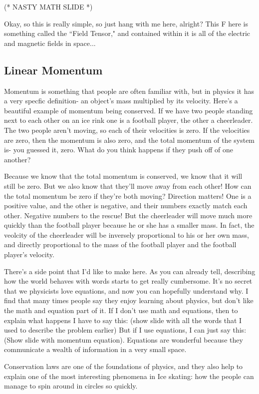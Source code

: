 \documentclass[12pt]{article}
\begin{document}
(* NASTY MATH SLIDE *)

Okay, so this is really simple, so just hang with me here, alright? 
This F here is something called the ``Field Tensor," and 
contained within it is all of the electric and magnetic fields in space... 
\subsection{Linear Momentum}
Momentum is something
that people are often familiar with, but in physics it has a very specfic definition-
an object's mass multiplied by its velocity.
Here's a beautiful example of momentum being conserved. If we have two people standing next to each other on 
an ice rink one is a football player, the other a cheerleader. The two people aren't moving,
so each of their velocities is zero. If the velocities are zero, then the momentum is 
also zero, and the total momentum of the system is- you guessed it, zero. 
What do you think happens if they push off of one another? 

Because we know that the total momentum is conserved, we know that it will still be zero.
But we also know that they'll move away from each other! How can the total momentum be
zero if they're both moving? Direction matters! One is a positive value, and the other
is negative, and their numbers exactly match each other. Negative numbers to the 
rescue!
But the cheerleader will move much more quickly
than the football player because he or she has a smaller mass. In fact, the veolcity 
of the cheerleader will be inversely proportional to his or her own mass, and directly 
proportional to the mass of the football player and the football player's velocity. 

There's a side point that I'd like to make here.
As you can already tell, describing how the world behaves with words starts to get 
really cumbersome. It's no secret that we physicists love equations, and now you
can hopefully understand why. I find that many times people say they enjoy learning
about physics, but don't like the math and equation part of it. If I don't use
math and equations, then to explain what happens I have to say this:
(show slide with all the words that I used to 
describe the problem earlier)
But if I use equations, I can just say this:
(Show slide with momentum equation). 
Equations are wonderful because they communicate a wealth of information in a very 
small space. 

Conservation laws are one of the foundations of physics, and they also help to explain
one of the most interesting phenomena in Ice skating: how the people can manage to 
spin around in circles so quickly. 
\end{document}
